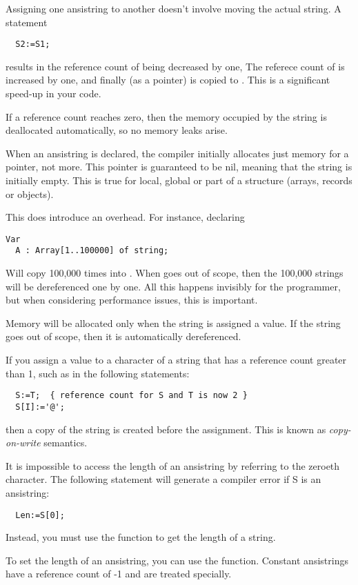 \documentclass{report}
\begin{document}
Assigning one ansistring to another doesn't involve moving the actual
string. A statement
\begin{verbatim}
  S2:=S1;
\end{verbatim}
results in the reference count of  being decreased by one,
The referece count of  is increased by one, and finally 
(as a pointer) is copied to . This is a significant speed-up in
your code.

If a reference count reaches zero, then the memory occupied by the
string is deallocated automatically, so no memory leaks arise.

When an ansistring is declared, the \fpc compiler initially
allocates just memory for a pointer, not more. This pointer is guaranteed
to be nil, meaning that the string is initially empty. This is
true for local, global or part of a structure (arrays, records or objects).

This does introduce an overhead. For instance, declaring
\begin{verbatim}
Var
  A : Array[1..100000] of string;
\end{verbatim}
Will copy 100,000 times  into . When  goes out of scope, then
the 100,000 strings will be dereferenced one by one. All this happens
invisibly for the programmer, but when considering performance issues,
this is important.

Memory will be allocated only when the string is assigned a value.
If the string goes out of scope, then it is automatically dereferenced.

If you assign a value to a character of a string that has a reference count
greater than 1, such as in the following
statements:
\begin{verbatim}
  S:=T;  { reference count for S and T is now 2 }
  S[I]:='@';
\end{verbatim}
then a copy of the string is created before the assignment. This is known
as {\em copy-on-write} semantics.

It is impossible to access the length of an ansistring by referring to
the zeroeth character. The following statement will generate a compiler
error if S is an ansistring:
\begin{verbatim}
  Len:=S[0];
\end{verbatim}
Instead, you must use the  function to get the length of a
string.

To set the length of an ansistring, you can use the 
function.
Constant ansistrings have a reference count of -1 and are treated specially.
\end{document}
